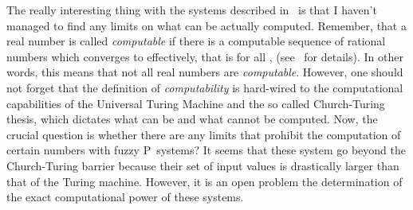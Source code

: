 \documentclass{amsart}
\theoremstyle{definition}
\begin{document}
The really interesting thing with the systems described in~\cite{syropoulos06} is that I 
haven't managed to find any limits on what can be actually computed. Remember, that
a real number  is called {\em computable} if there is a computable
sequence  of rational numbers which converges to  effectively,
that is for all ,  (see~\cite{weihrauch00,zheng01}
for details). In other words, this means that not all real numbers are {\em computable}.
However, one should not forget that the definition of {\em computability} is hard-wired to
the computational capabilities of the Universal Turing Machine and the so called
Church-Turing thesis, which dictates what can be and what cannot be computed. 
Now, the crucial question is whether there are any limits that prohibit the 
computation of certain numbers with fuzzy P~systems? It seems that these system
go beyond the Church-Turing barrier because their set of input values is drastically
larger than that of the Turing machine. However, it is an open problem the determination
of the exact computational power of these systems.
\end{document}
